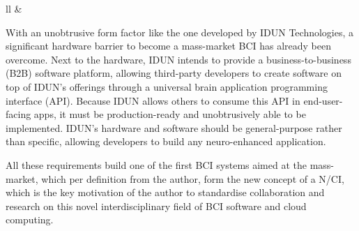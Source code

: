 \begin{table}[ht]
{\begin{tabular}{ll}
        &
                                                                                                               \\ \hline
    \end{tabular}%
  }
  \vspace{10pt}
  \caption{Axes label descriptions of the three-dimensionality for the definition of a N/CI as shown on \autoref{fig:nci-definition}}
  \label{tab:nci-axis}
\end{table}

\newpage

With an unobtrusive form factor like the one developed by IDUN Technologies, a significant hardware barrier to become a mass-market BCI has already been overcome. Next to the hardware, IDUN intends to provide a business-to-business (B2B) software platform, allowing third-party developers to create software on top of IDUN's offerings through a universal brain application programming interface (API). Because IDUN allows others to consume this API in end-user-facing apps, it must be production-ready and unobtrusively able to be implemented. IDUN's hardware and software should be general-purpose rather than specific, allowing developers to build any neuro-enhanced application. 

All these requirements build one of the first BCI systems aimed at the mass-market, which per definition from the author, form the new concept of a N/CI, which is the key motivation of the author to standardise collaboration and research on this novel interdisciplinary field of BCI software and cloud computing.

